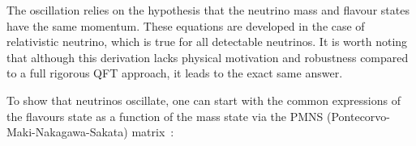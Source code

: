 The oscillation relies on the hypothesis that the neutrino mass and
flavour states have the same momentum. These equations are developed
in the case of relativistic neutrino, which is true for all detectable
neutrinos\footnotemark.  It is worth noting that although this
derivation lacks physical motivation and robustness compared to a full
rigorous QFT approach, it leads to the exact same answer.


To show that neutrinos oscillate, one can start with the common
expressions of the flavours state as a function of the mass state via
the \Gls{PMNS} (Pontecorvo-Maki-Nakagawa-Sakata)
matrix~\cite{Pontecorvo:1967fh,Pontecorvo:1957cp,Bilenky:1978nj,Maki:1962mu}:

